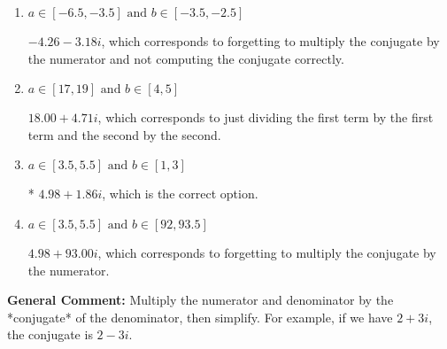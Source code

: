\documentclass{extbook}[14pt]
\begin{document}
\begin{enumerate}
{\begin{enumerate}[label=\Alph*.]
 $249.00  + 1.86 i$, which corresponds to forgetting to multiply the conjugate by the numerator and using a plus instead of a minus in the denominator.
\item \( a \in [-6.5, -3.5] \text{ and } b \in [-3.5, -2.5] \)

 $-4.26  - 3.18 i$, which corresponds to forgetting to multiply the conjugate by the numerator and not computing the conjugate correctly.
\item \( a \in [17, 19] \text{ and } b \in [4, 5] \)

 $18.00  + 4.71 i$, which corresponds to just dividing the first term by the first term and the second by the second.
\item \( a \in [3.5, 5.5] \text{ and } b \in [1, 3] \)

* $4.98  + 1.86 i$, which is the correct option.
\item \( a \in [3.5, 5.5] \text{ and } b \in [92, 93.5] \)

 $4.98  + 93.00 i$, which corresponds to forgetting to multiply the conjugate by the numerator.
\end{enumerate}

\textbf{General Comment:} Multiply the numerator and denominator by the *conjugate* of the denominator, then simplify. For example, if we have $2+3i$, the conjugate is $2-3i$.
}
\end{enumerate}
\end{document}
